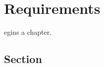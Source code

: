 \let\textcircled=\pgftextcircled
\chapter{Requirements}
\label{chap:requirements}

egins a chapter. 

\section{Section}
\label{sec:req}

